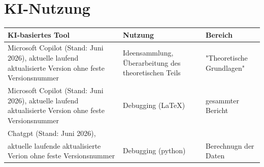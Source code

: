 \chapter{KI-Nutzung}


\begin{table}[H]
\centering
\begin{tabular}{|p{5cm}|p{3cm}|p{3cm}|}
\hline
\textbf{KI-basiertes Tool} & \textbf{Nutzung} & \textbf{Bereich} \\
\hline
Microsoft Copilot (Stand: Juni 2026), aktuelle laufend aktualisierte Version ohne feste Versionsnummer 
& Ideensammlung, Überarbeitung des theoretischen Teils 
& "Theoretische Grundlagen" \\
\hline
Microsoft Copilot (Stand: Juni 2026), aktuelle laufend aktualisierte Version ohne feste Versionsnummer 
& Debugging (LaTeX) & gesammter Bericht \\
\hline
Chatgpt (Stand: Juni 2026),\\
aktuelle laufende aktualisierte Verion ohne feste Versionsnummer&Debugging (python) & Berechnugn der Daten\\
\hline
\end{tabular}
\end{table}
